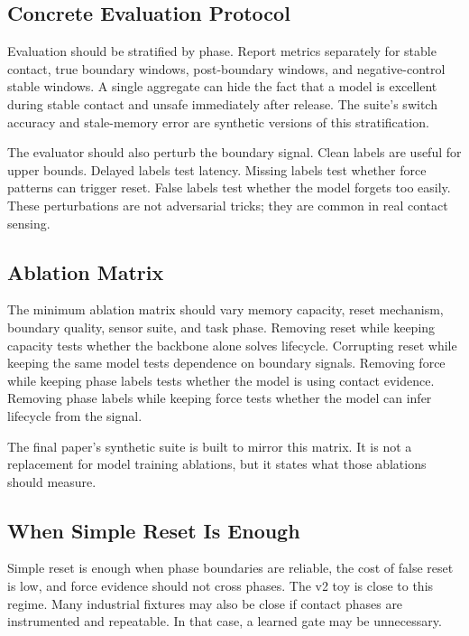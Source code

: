 \documentclass{article}
\begin{document}
\subsection{Concrete Evaluation Protocol}

Evaluation should be stratified by phase. Report metrics separately for stable
contact, true boundary windows, post-boundary windows, and negative-control
stable windows. A single aggregate can hide the fact that a model is excellent
during stable contact and unsafe immediately after release. The suite's switch
accuracy and stale-memory error are synthetic versions of this stratification.

The evaluator should also perturb the boundary signal. Clean labels are useful
for upper bounds. Delayed labels test latency. Missing labels test whether force
patterns can trigger reset. False labels test whether the model forgets too
easily. These perturbations are not adversarial tricks; they are common in real
contact sensing.

\subsection{Ablation Matrix}

The minimum ablation matrix should vary memory capacity, reset mechanism,
boundary quality, sensor suite, and task phase. Removing reset while keeping
capacity tests whether the backbone alone solves lifecycle. Corrupting reset
while keeping the same model tests dependence on boundary signals. Removing
force while keeping phase labels tests whether the model is using contact
evidence. Removing phase labels while keeping force tests whether the model can
infer lifecycle from the signal.

The final paper's synthetic suite is built to mirror this matrix. It is not a
replacement for model training ablations, but it states what those ablations
should measure.

\subsection{When Simple Reset Is Enough}

Simple reset is enough when phase boundaries are reliable, the cost of false
reset is low, and force evidence should not cross phases. The v2 toy is close
to this regime. Many industrial fixtures may also be close if contact phases
are instrumented and repeatable. In that case, a learned gate may be
unnecessary.
\end{document}
